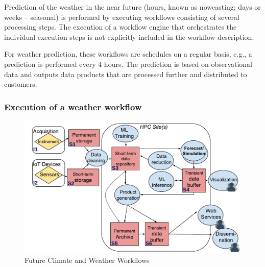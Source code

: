 \documentclass[a4paper, twocolumn]{article}
\begin{document}
Prediction of the weather in the near future (hours, known as nowcasting; days or weeks -- seasonal) is performed by executing workflows consisting of several processing steps. The execution of a workflow engine that orchestrates the individual execution steps is not explicitly included in the workflow description.

For weather prediction, these workflows are schedules on a regular basis, e.g., a prediction is performed every 4 hours. The prediction is based on observational data and outputs data products that are processed further and distributed to customers.

\subsubsection{Execution of a weather workflow}



\begin{figure}[b]
  \includegraphics[width=\columnwidth]{climateweather-workflow}
  \caption{Future Climate and Weather Workflows}
  \label{fig:climateWeather}
\end{figure}
\end{document}
